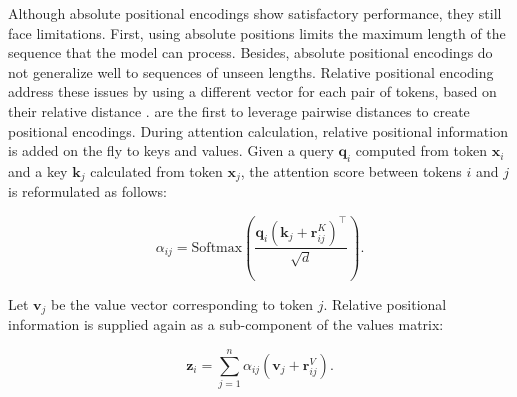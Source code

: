 Although absolute positional encodings show satisfactory performance, they still face limitations. First, using absolute positions limits the maximum length of the sequence that the model can process. Besides, absolute positional encodings do not generalize well to sequences of unseen lengths. Relative positional encoding address these issues by using a different vector for each pair of tokens, based on their relative distance \citep{shaw2018self, huang2018music, ke2020rethinking}.  \citet{shaw2018self} are the first to leverage pairwise distances to create positional encodings. During attention calculation, relative positional information is added on the fly to keys and values. Given a query $\bm{q}_i$ computed from token $\bm{x}_i$ and a key $\bm{k}_j$ calculated from token $\bm{x}_j$, the attention score between tokens $i$ and $j$ is reformulated as follows:

\begin{equation}
    \alpha_{ij} = \mathrm{Softmax}\left(\frac{\bm{q}_i (\bm{k}_j + \bm{r}^K_{ij})^{\top}}{\sqrt{d}}\right).
\end{equation}

Let $\bm{v}_j$ be the value vector corresponding to token $j$. Relative positional information is supplied again as a sub-component of the values matrix:

\begin{equation}
    \bm{z}_i = \sum_{j=1}^n \alpha_{ij} (\bm{v}_j + \bm{r}^V_{ij}).
\end{equation}



